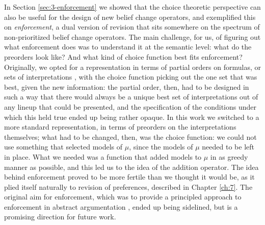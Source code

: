 In Section \ref{sec:3-enforcement} we showed that the choice theoretic
perspective can also be useful for the design of new belief change operators,
and exemplified this on \emph{enforcement}, a dual version of revision 
that sits somewhere on the spectrum of non-prioritized belief change operators.
The main challenge, for us, of figuring out what enforcement does
was to understand it at the semantic level: what do the preorders look like?
And what kind of choice function best fits enforcement?
Originally, we opted for a representation in terms of partial orders on 
formulas, or sets of interpretations \cite{HaretWW18},
with the choice function picking out the one set that was best, given the 
new information: the partial order, then, had to be designed in such a 
way that there would always be a unique best set of interpretations out of 
any lineup that could be presented, and the specification of the
conditions under which this held true ended up being rather opaque.
In this work we switched to a more standard representation,
in terms of preorders on the interpretations themselves; what had to be changed, then, 
was the choice function: we could not use something that selected models of 
$\mu$, since the models of $\mu$ needed to be left in place. What we needed 
was a function that added models to $\mu$ in as greedy manner as possible, 
and this led us to the idea of the addition operator.
The idea behind enforcement proved to be more fertile than we thought it would be,
as it plied itself naturally to revision of preferences, 
described in Chapter \ref{ch:7}.
The original aim for enforcement, which was to provide a principled 
approach to enforcement in abstract argumentation \cite{Baumann12}, 
ended up being sidelined, but is a promising direction for future work.

